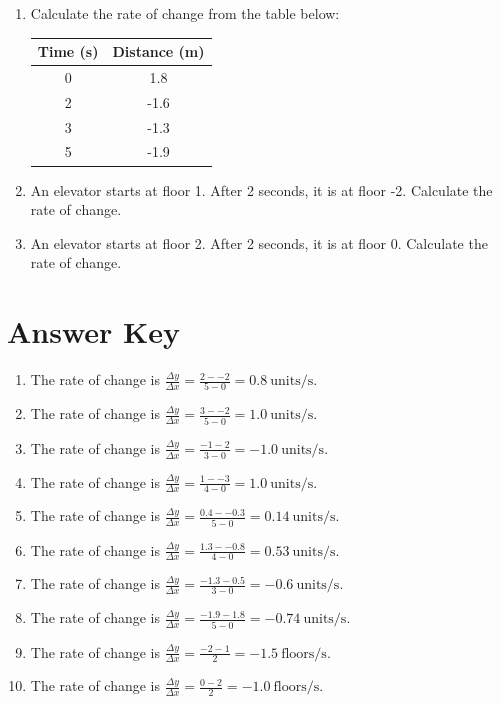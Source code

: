 \documentclass[12pt]{article}
\begin{document}
\begin{enumerate}
\vspace{2cm}
\item Calculate the rate of change from the table below:

\begin{tabular}{|c|c|}
\hline
Time (s) & Distance (m) \\
\hline
0 & 1.8 \\
2 & -1.6 \\
3 & -1.3 \\
5 & -1.9 \\
\hline
\end{tabular}

\vspace{2cm}
\newpage\item An elevator starts at floor 1. After 2 seconds, it is at floor -2. Calculate the rate of change.

\vspace{7cm}
\newpage\item An elevator starts at floor 2. After 2 seconds, it is at floor 0. Calculate the rate of change.

\vspace{7cm}
\end{enumerate}
\newpage
\section*{Answer Key}
\begin{enumerate}
\item The rate of change is $\frac{\Delta y}{\Delta x} = \frac{2--2}{5-0} = 0.8~\text{units/s}$.

\item The rate of change is $\frac{\Delta y}{\Delta x} = \frac{3--2}{5-0} = 1.0~\text{units/s}$.

\item The rate of change is $\frac{\Delta y}{\Delta x} = \frac{-1-2}{3-0} = -1.0~\text{units/s}$.

\item The rate of change is $\frac{\Delta y}{\Delta x} = \frac{1--3}{4-0} = 1.0~\text{units/s}$.

\item The rate of change is $\frac{\Delta y}{\Delta x} = \frac{0.4--0.3}{5-0} = 0.14~\text{units/s}$.

\item The rate of change is $\frac{\Delta y}{\Delta x} = \frac{1.3--0.8}{4-0} = 0.53~\text{units/s}$.

\item The rate of change is $\frac{\Delta y}{\Delta x} = \frac{-1.3-0.5}{3-0} = -0.6~\text{units/s}$.

\item The rate of change is $\frac{\Delta y}{\Delta x} = \frac{-1.9-1.8}{5-0} = -0.74~\text{units/s}$.

\item The rate of change is $\frac{\Delta y}{\Delta x} = \frac{-2-1}{2} = -1.5~\text{floors/s}$.

\item The rate of change is $\frac{\Delta y}{\Delta x} = \frac{0-2}{2} = -1.0~\text{floors/s}$.

\end{enumerate}
\end{document}
